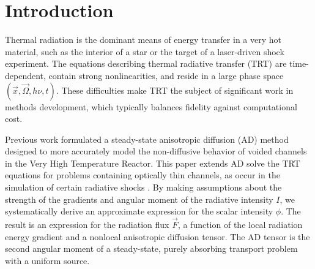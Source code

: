 \documentclass[11pt,letter,twoside]{mc2011}
\begin{document}
\section{Introduction}
Thermal radiation is the dominant means of energy transfer in a very hot
material, such as the interior
of a star or the
target of a laser-driven shock experiment. The equations describing thermal
radiative transfer (TRT) are
time-dependent, contain strong nonlinearities, and reside in a large phase
space $(\vec{x}, \vec{\Omega}, h\nu, t)$.
These difficulties make TRT the subject of significant work in methods
development, which typically balances fidelity against computational cost. 
%
%

Previous work \cite{Lar2009c} formulated a steady-state anisotropic diffusion
(AD) method designed to more accurately model the non-diffusive behavior of
voided channels in the Very High Temperature Reactor.  This paper extends AD
solve the TRT equations for problems containing optically thin channels, as
occur in the simulation of certain radiative shocks \cite{Crash2010}.
By making assumptions about the strength of the gradients and
angular moment of the radiative intensity $I$, we systematically derive an
approximate expression for the scalar intensity $\phi$. The result is an
expression for the radiation flux $\vec{F}$, a function of the local radiation
energy
gradient and a nonlocal anisotropic diffusion tensor. The AD tensor is the
second angular moment of a steady-state, purely absorbing transport problem
with a uniform source.
\end{document}
